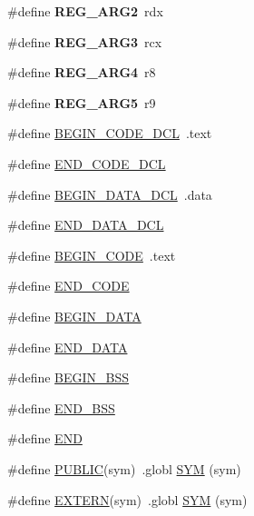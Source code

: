 \begin{DoxyCompactItemize}
\#define {\bfseries R\+E\+G\+\_\+\+A\+R\+G2}~rdx
\item 
\mbox{\label{group__RTEMSScoreCPUx86-64ASM_gac93685c17835c761df95bfb12210bdbe}} 
\#define {\bfseries R\+E\+G\+\_\+\+A\+R\+G3}~rcx
\item 
\mbox{\label{group__RTEMSScoreCPUx86-64ASM_ga1d264e5fc834ce8600b0dabb785eb0ca}} 
\#define {\bfseries R\+E\+G\+\_\+\+A\+R\+G4}~r8
\item 
\mbox{\label{group__RTEMSScoreCPUx86-64ASM_ga8c5c5b0809b1fe5db8287178d4053070}} 
\#define {\bfseries R\+E\+G\+\_\+\+A\+R\+G5}~r9
\item 
\#define \mbox{\hyperlink{group__RTEMSScoreCPUx86-64ASM_ga63dd305e6cb437ad2dc29a4184f96fbc}{B\+E\+G\+I\+N\+\_\+\+C\+O\+D\+E\+\_\+\+D\+CL}}~.text
\item 
\#define \mbox{\hyperlink{group__RTEMSScoreCPUx86-64ASM_gad7bee6a7cae4ed99b9f83f54afaecec8}{E\+N\+D\+\_\+\+C\+O\+D\+E\+\_\+\+D\+CL}}
\item 
\#define \mbox{\hyperlink{group__RTEMSScoreCPUx86-64ASM_ga7f059077f76d2de57e245990dc6fdf25}{B\+E\+G\+I\+N\+\_\+\+D\+A\+T\+A\+\_\+\+D\+CL}}~.data
\item 
\#define \mbox{\hyperlink{group__RTEMSScoreCPUx86-64ASM_gaba5951c6a7df52e7c13d07a6823e9758}{E\+N\+D\+\_\+\+D\+A\+T\+A\+\_\+\+D\+CL}}
\item 
\#define \mbox{\hyperlink{group__RTEMSScoreCPUx86-64ASM_ga6d6dc213aff5b736968e2aff37eb2c99}{B\+E\+G\+I\+N\+\_\+\+C\+O\+DE}}~.text
\item 
\#define \mbox{\hyperlink{group__RTEMSScoreCPUx86-64ASM_gaac423acb743520558daf6a94e1e34534}{E\+N\+D\+\_\+\+C\+O\+DE}}
\item 
\#define \mbox{\hyperlink{group__RTEMSScoreCPUx86-64ASM_ga93fba2b033eb50ec004405c59faaa824}{B\+E\+G\+I\+N\+\_\+\+D\+A\+TA}}
\item 
\#define \mbox{\hyperlink{group__RTEMSScoreCPUx86-64ASM_gab989978585b78e98ff314e8abb5f9bb0}{E\+N\+D\+\_\+\+D\+A\+TA}}
\item 
\#define \mbox{\hyperlink{group__RTEMSScoreCPUx86-64ASM_ga50f110f0489e48ceda4a0473a35d2978}{B\+E\+G\+I\+N\+\_\+\+B\+SS}}
\item 
\#define \mbox{\hyperlink{group__RTEMSScoreCPUx86-64ASM_gae8acdd1ba8aa625ce8a829773fd512e2}{E\+N\+D\+\_\+\+B\+SS}}
\item 
\#define \mbox{\hyperlink{group__RTEMSScoreCPUx86-64ASM_ga29fd18bed01c4d836c7ebfe73a125c3f}{E\+ND}}
\item 
\#define \mbox{\hyperlink{group__RTEMSScoreCPUx86-64ASM_ga5e536c0e80cb78da6a74541281111e40}{P\+U\+B\+L\+IC}}(sym)~.globl \mbox{\hyperlink{group__RTEMSScoreCPUx86-64ASM_gafe05d428a5f345f51fb591debb815325}{S\+YM}} (sym)
\item 
\#define \mbox{\hyperlink{group__RTEMSScoreCPUx86-64ASM_ga9808b867f8d1bd54d78548a5cd5dc415}{E\+X\+T\+E\+RN}}(sym)~.globl \mbox{\hyperlink{group__RTEMSScoreCPUx86-64ASM_gafe05d428a5f345f51fb591debb815325}{S\+YM}} (sym)
\end{DoxyCompactItemize}


